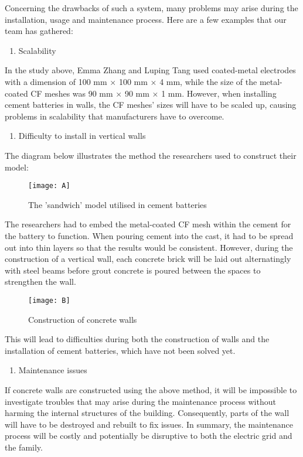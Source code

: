 Concerning the drawbacks of such a system, many problems may arise during the installation, usage and maintenance process. Here are a few examples that our team has gathered:
\begin{enumerate}
    \item Scalability
\end{enumerate}
In the study above, Emma Zhang and Luping Tang used coated-metal electrodes with a dimension of 100 mm $\times$ 100 mm $\times$ 4 mm, while the size of the metal-coated CF meshes was 90 mm $\times$ 90 mm $\times$ 1 mm. However, when installing cement batteries in walls, the CF meshes' sizes will have to be scaled up, causing problems in scalability that manufacturers have to overcome.

\begin{enumerate}[resume]
    \item Difficulty to install in vertical walls
\end{enumerate}
The diagram below illustrates the method the researchers used to construct their model:
\begin{figure}[H]
\centering
\texttt{[image: A]}
\caption{The 'sandwich' model utilised in cement batteries}
\label{fig:bat}
\end{figure}
The researchers had to embed the metal-coated CF mesh within the cement for the battery to function. When pouring cement into the cast, it had to be spread out into thin layers so that the results would be consistent. However, during the construction of a vertical wall, each concrete brick will be laid out alternatingly with steel beams before grout concrete is poured between the spaces to strengthen the wall.
\begin{figure}[H]
\centering
\texttt{[image: B]}
\caption{Construction of concrete walls}\cite{theconstructor:walls}
\end{figure}
This will lead to difficulties during both the construction of walls and the installation of cement batteries, which have not been solved yet.

\begin{enumerate}[resume]
    \item Maintenance issues
\end{enumerate}
If concrete walls are constructed using the above method, it will be impossible to investigate troubles that may arise during the maintenance process without harming the internal structures of the building. Consequently, parts of the wall will have to be destroyed and rebuilt to fix issues. In summary, the maintenance process will be costly and potentially be disruptive to both the electric grid and the family.